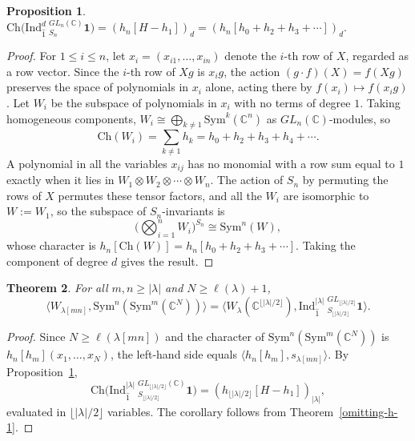 \documentclass[reqno]{amsart}
\theoremstyle{plain}
\newtheorem{theorem}{Theorem}[section]
\newtheorem{proposition}[theorem]{Proposition}
\theoremstyle{definition}
\theoremstyle{remark}
\theoremstyle{plain}
\newcommand{\C}{\mathbb{C}}
\begin{document}
\begin{proposition}\label{Equal-inner-products}
$\mathrm{Ch}\big(\mathrm{Ind}_{\hat{1}}^d\ _{S_n}^{GL_n(\C)}\mathbf{1}\big)=(h_n[H-h_1])_d=(h_n[h_0+h_2+h_3+\cdots])_d.$
\end{proposition}
\begin{proof}
For $1\le i\le n$, let $x_i=(x_{i1},\dots,x_{in})$ denote the $i$-th row of
$X$, regarded as a row vector. Since the $i$-th row of $Xg$ is $x_ig$, the
action $(g\cdot f)(X)=f(Xg)$ preserves the space of polynomials in $x_i$ alone,
acting there by $f(x_i)\mapsto f(x_ig)$. Let $W_i$ be the subspace of
polynomials in $x_i$ with no terms of degree $1$. Taking homogeneous
components, $W_i\cong\bigoplus_{k\ne1}\mathrm{Sym}^k(\C^n)$ as
$GL_n(\C)$-modules, so
\begin{equation*}
    \mathrm{Ch}(W_i) = \sum_{k\neq 1} h_k = h_0 + h_2 + h_3 + h_4 + \cdots.
\end{equation*}
A polynomial in all the variables $x_{ij}$ has no monomial with a row sum
equal to $1$ exactly when it lies in $W_1\otimes W_2\otimes\cdots\otimes W_n$.
The action of $S_n$ by permuting the rows of $X$ permutes these tensor
factors, and all the $W_i$ are isomorphic to $W:=W_1$, so the subspace of
$S_n$-invariants is
\begin{equation*}
    \Big( \bigotimes_{i=1}^n W_i \Big)^{S_n} \cong \mathrm{Sym}^n(W),
\end{equation*}
whose character is $h_n[\mathrm{Ch}(W)]=h_n[h_0 + h_2 + h_3 + \cdots]$. Taking
the component of degree $d$ gives the result.
\end{proof}

\begin{theorem}\label{final-corollary}
For all $m,n\geq |\lambda|$ and $N\ge\ell(\lambda)+1$,
$$\langle W_{\lambda[mn]},\mathrm{Sym}^n(\mathrm{Sym}^m(\C^N))\rangle=\langle W_\lambda(\C^{\lfloor|\lambda|/2\rfloor}),\mathrm{Ind}_{\hat{1}}^{|\lambda|}\ _{S_{\lfloor|\lambda|/2\rfloor}}^{GL_{\lfloor|\lambda|/2\rfloor}}\mathbf{1}\rangle.$$
\end{theorem}
\begin{proof}
Since $N\ge\ell(\lambda[mn])$ and the character of
$\mathrm{Sym}^n(\mathrm{Sym}^m(\C^N))$ is $h_n[h_m](x_1,\dots,x_N)$, the
left-hand side equals $\langle h_n[h_m],s_{\lambda[mn]}\rangle$. By
Proposition~\ref{Equal-inner-products},
$$\mathrm{Ch}\big(\mathrm{Ind}_{\hat{1}}^{|\lambda|}\ _{S_{\lfloor |\lambda|/2\rfloor}}^{GL_{\lfloor |\lambda|/2\rfloor}(\C)}\mathbf{1}\big)=(h_{\lfloor |\lambda|/2\rfloor}[H-h_1])_{|\lambda|},$$
evaluated in $\lfloor |\lambda|/2\rfloor$ variables. The corollary follows from
Theorem~\ref{omitting-h-1}.
\end{proof}
\end{document}
